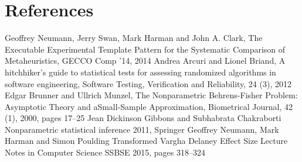 \documentclass[]{article}
\begin{document}
\section{References}


\begin{thebibliography}{99}
Geoffrey Neumann, Jerry Swan, Mark Harman and John A. Clark,
The Executable Experimental Template Pattern for the Systematic Comparison of Metaheuristics,
GECCO Comp '14,
2014
Andrea Arcuri and Lionel Briand,
A hitchhiker's guide to statistical tests for assessing randomized algorithms in software engineering,
Software Testing, Verification and Reliability, 24 (3),
2012
Edgar Brunner and Ullrich Munzel, 
The Nonparametric Behrens-Fisher Problem: Asymptotic Theory and aSmall-Sample Approximation, 
Biometrical Journal, 42 (1), 
2000, 
pages 17--25
Jean Dickinson Gibbons and Subhabrata Chakraborti 
Nonparametric statistical inference 
2011, 
Springer
Geoffrey Neumann, Mark Harman and Simon Poulding 
Transformed Vargha Delaney Effect Size 
Lecture Notes in Computer Science 
SSBSE 
2015, 
pages 318--324
\end{thebibliography}
\end{document}
